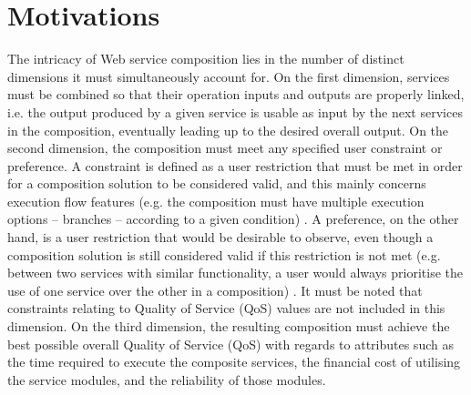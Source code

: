 \section{Motivations}
The intricacy of Web service composition lies in the number of distinct dimensions it must simultaneously account for. On
the first dimension, services must be combined so that their operation inputs and outputs are properly linked, i.e. the output
produced by a given service is usable as input by the next services in the composition, eventually leading up to the desired overall
output. On the second dimension, the composition must meet any specified user constraint or preference. A constraint is defined as a user restriction that must
be met in order for a composition solution to be considered valid, and this mainly concerns execution flow features (e.g. the composition must have
multiple execution options -- branches -- according to a given condition) \cite{wang2014automated,sohrabi2009web,karakoc2009composing}. A preference, on the other hand, is a user restriction that would
be desirable to observe, even though a composition solution is still considered valid if this restriction is not met (e.g. between two services with similar
functionality, a user would always prioritise the use of one service over the other in a composition) \cite{wang2014automated}. It must be noted that constraints relating to Quality of Service (QoS) values are not included in this dimension. On the third dimension, the resulting composition must achieve the best possible
overall Quality of Service (QoS) with regards to attributes such as the time required to execute the composite services, the
financial cost of utilising the service modules, and the reliability of those modules.

